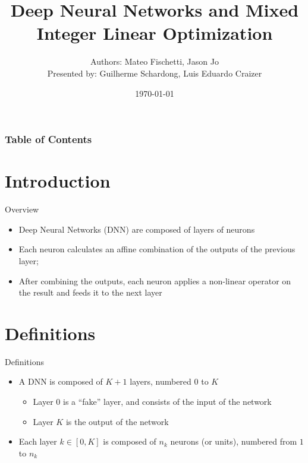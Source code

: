 \documentclass{beamer}
\title[DNN and MILP]{Deep Neural Networks and Mixed Integer Linear Optimization}
\author{Authors: Mateo Fischetti, Jason Jo \\
Presented by: Guilherme Schardong, Luis Eduardo Craizer}
\date{\today}
\begin{document}
\begin{frame}
\titlepage
\end{frame}

\begin{frame}
\frametitle{Table of Contents}
\tableofcontents
\end{frame}

\section{Introduction}
\begin{frame}{Overview}
  \begin{itemize}
  \item Deep Neural Networks (DNN) are composed of layers of neurons
  \item Each neuron calculates an affine combination of the outputs of the previous layer;
  \item After combining the outputs, each neuron applies a non-linear operator on the result and feeds it to the next layer
  \end{itemize}
\end{frame}

\section{Definitions}
\begin{frame}{Definitions}
  \begin{itemize}
  \item A DNN is composed of $K+1$ layers, numbered $0$ to $K$
    \begin{itemize}
    \item Layer $0$ is a ``fake'' layer, and consists of the input of the network
    \item Layer $K$ is the output of the network
    \end{itemize}
  \item Each layer $k \in [0, K]$ is composed of $n_k$ neurons (or units), numbered from $1$ to $n_k$
  \end{itemize}
\end{frame}
\end{document}
